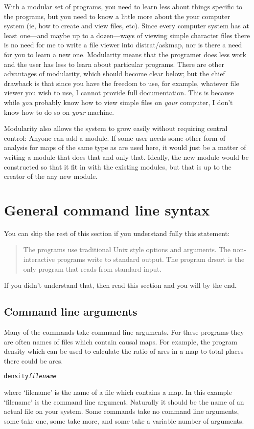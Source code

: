 \documentclass[%
	11pt,
        a4paper,
        twoside]{workrep}
\newcommand*{\prg}[1]{\textsf{#1}}		%
\newcommand{\dram}{\prg{distrat}/\prg{askmap}\xspace}	%
\newcommand{\dash}{---}
\begin{document}
With a modular set of programs, you need
to learn less about things specific to the programs, but you need to
know a little more about the your computer system (ie, how to create
and view files, etc).  Since every computer system has at least
one\dash and maybe up to a dozen\dash ways of viewing simple
character files there is no need for me to write a file viewer into
\dram, nor is there a need for you to learn a new one.  Modularity
means that the programer does less work and the user has less to
learn about particular programs.  There are other advantages of modularity,
which should become clear below; but the chief drawback is that since
you have the freedom to use, for example, whatever file viewer you
wish to use, I cannot provide full documentation.  This is because while
\emph{you} probably know how to view simple files on \emph{your} computer,
I don't know how to do so on \emph{your} machine.

Modularity also allows the system to grow easily without requiring
central control: Anyone can add a module.  If some user needs some
other form of analysis for maps of the same type as are used here, it
would just be a matter of writing a module that does that and only
that.  Ideally, the new module would be constructed so that it fit in
with the existing modules, but that is up to the creator of the any
new module.

\section{General command line syntax} \label{sec:commandline}

You can skip the rest of this section if you understand fully
this statement:
\begin{quote}
The programs use traditional Unix style options and arguments.
The non-interactive programs write to standard output.  The
program \prg{drsort} is the only program that reads from standard input.
\end{quote}
If you didn't understand that, then read this section and you will by
the end.

\subsection{Command line arguments}

Many of the commands take command line arguments.  For these
programs they are often names of files which contain causal maps.
For example, the program \prg{density} which can be used to calculate
the ratio of arcs in a map to total places there could be arcs.
\begin{alltt}
  density \emph{filename}
\end{alltt}
where `filename' is the name of a file which contains a map.  In this
example `filename' is the command line argument.  Naturally it should
be the name of an actual file on your system.  Some commands take
no command line arguments, some take one, some take more, and some
take a variable number of arguments.
\end{document}
